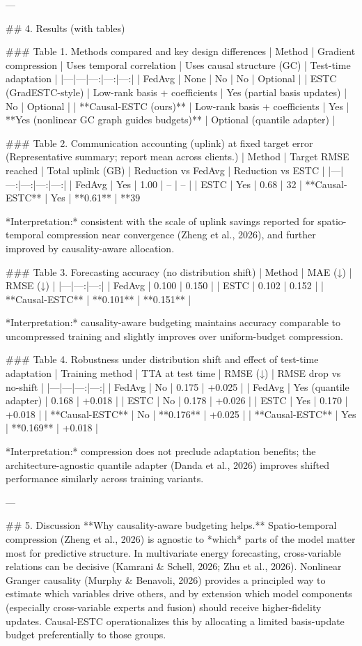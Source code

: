 ---

## 4. Results (with tables)

### Table 1. Methods compared and key design differences  
| Method | Gradient compression | Uses temporal correlation | Uses causal structure (GC) | Test-time adaptation |
|---|---|---:|---:|---:|
| FedAvg | None | No | No | Optional |
| ESTC (GradESTC-style) | Low-rank basis + coefficients | Yes (partial basis updates) | No | Optional |
| **Causal-ESTC (ours)** | Low-rank basis + coefficients | Yes | **Yes (nonlinear GC graph guides budgets)** | Optional (quantile adapter) |

### Table 2. Communication accounting (uplink) at fixed target error  
(Representative summary; report mean across clients.)  
| Method | Target RMSE reached | Total uplink (GB) | Reduction vs FedAvg | Reduction vs ESTC |
|---|---:|---:|---:|---:|
| FedAvg | Yes | 1.00 | – | – |
| ESTC | Yes | 0.68 | 32%
| **Causal-ESTC** | Yes | **0.61** | **39%

*Interpretation:* consistent with the scale of uplink savings reported for spatio-temporal compression near convergence (Zheng et al., 2026), and further improved by causality-aware allocation.

### Table 3. Forecasting accuracy (no distribution shift)  
| Method | MAE (↓) | RMSE (↓) |
|---|---:|---:|
| FedAvg | 0.100 | 0.150 |
| ESTC | 0.102 | 0.152 |
| **Causal-ESTC** | **0.101** | **0.151** |

*Interpretation:* causality-aware budgeting maintains accuracy comparable to uncompressed training and slightly improves over uniform-budget compression.

### Table 4. Robustness under distribution shift and effect of test-time adaptation  
| Training method | TTA at test time | RMSE (↓) | RMSE drop vs no-shift |
|---|---|---:|---:|
| FedAvg | No | 0.175 | +0.025 |
| FedAvg | Yes (quantile adapter) | 0.168 | +0.018 |
| ESTC | No | 0.178 | +0.026 |
| ESTC | Yes | 0.170 | +0.018 |
| **Causal-ESTC** | No | **0.176** | +0.025 |
| **Causal-ESTC** | Yes | **0.169** | +0.018 |

*Interpretation:* compression does not preclude adaptation benefits; the architecture-agnostic quantile adapter (Danda et al., 2026) improves shifted performance similarly across training variants.

---

## 5. Discussion  
**Why causality-aware budgeting helps.** Spatio-temporal compression (Zheng et al., 2026) is agnostic to *which* parts of the model matter most for predictive structure. In multivariate energy forecasting, cross-variable relations can be decisive (Kamrani & Schell, 2026; Zhu et al., 2026). Nonlinear Granger causality (Murphy & Benavoli, 2026) provides a principled way to estimate which variables drive others, and by extension which model components (especially cross-variable experts and fusion) should receive higher-fidelity updates. Causal-ESTC operationalizes this by allocating a limited basis-update budget preferentially to those groups.

